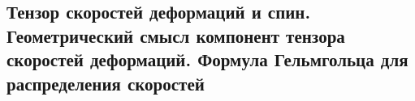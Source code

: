 

\subsection{Тензор скоростей деформаций и спин. Геометрический смысл компонент тензора скоростей деформаций. Формула Гельмгольца для распределения скоростей}



